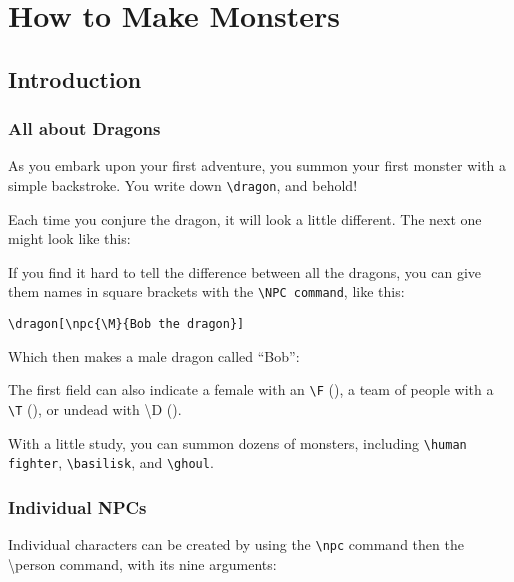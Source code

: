 \documentclass[a4paper,openany]{book}
\date{\today}
\begin{document}
\chapter{How to Make Monsters}

\section{Introduction}

\begin{multicols}{2}

\subsection{All about Dragons}

\begin{boxtext}

As you embark upon your first adventure, you summon your first monster with a simple backstroke.  You write down {\tt {\tt\textbackslash dragon}}, and behold!

\end{boxtext}

\dragon

Each time you conjure the dragon, it will look a little different.
The next one might look like this:

\dragon

If you find it hard to tell the difference between all the dragons, you can give them names in square brackets with the {\tt\textbackslash NPC command}, like this:

{\tt\textbackslash dragon[\textbackslash npc\{\textbackslash M\}\{Bob the dragon\}] }

Which then makes a male dragon called ``Bob'':


The first field can also indicate a female with an {\tt\textbackslash F} (\F), a team of people with a {\tt\textbackslash T} (\T), or undead with \textbackslash D (\D).

With a little study, you can summon dozens of monsters, including {\tt\textbackslash human fighter}, {\tt\textbackslash basilisk}, and {\tt \textbackslash ghoul}.

\subsection{Individual NPCs}

Individual characters can be created by using the {\tt\textbackslash npc} command then the \textbackslash person command, with its nine arguments:


\end{multicols}
\end{document}
